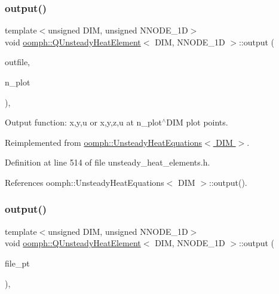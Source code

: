 \subsubsection{\texorpdfstring{output()}{output()}\hspace{0.1cm}{\footnotesize\ttfamily [2/4]}}
{\footnotesize\ttfamily template$<$unsigned D\+IM, unsigned N\+N\+O\+D\+E\+\_\+1D$>$ \\
void \hyperlink{classoomph_1_1QUnsteadyHeatElement}{oomph\+::\+Q\+Unsteady\+Heat\+Element}$<$ D\+IM, N\+N\+O\+D\+E\+\_\+1D $>$\+::output (\begin{DoxyParamCaption}\item[{std\+::ostream \&}]{outfile,  }\item[{const unsigned \&}]{n\+\_\+plot }\end{DoxyParamCaption})\hspace{0.3cm}{\ttfamily [inline]}, {\ttfamily [virtual]}}



Output function\+: x,y,u or x,y,z,u at n\+\_\+plot$^\wedge$\+D\+IM plot points. 



Reimplemented from \hyperlink{classoomph_1_1UnsteadyHeatEquations_a68794ad133c4a06bed09488cc7cd5e94}{oomph\+::\+Unsteady\+Heat\+Equations$<$ D\+I\+M $>$}.



Definition at line 514 of file unsteady\+\_\+heat\+\_\+elements.\+h.



References oomph\+::\+Unsteady\+Heat\+Equations$<$ D\+I\+M $>$\+::output().

\mbox{\label{classoomph_1_1QUnsteadyHeatElement_a8fc87ff8818027bbbb9aa48b4ab5cd91}} 
\subsubsection{\texorpdfstring{output()}{output()}\hspace{0.1cm}{\footnotesize\ttfamily [3/4]}}
{\footnotesize\ttfamily template$<$unsigned D\+IM, unsigned N\+N\+O\+D\+E\+\_\+1D$>$ \\
void \hyperlink{classoomph_1_1QUnsteadyHeatElement}{oomph\+::\+Q\+Unsteady\+Heat\+Element}$<$ D\+IM, N\+N\+O\+D\+E\+\_\+1D $>$\+::output (\begin{DoxyParamCaption}\item[{F\+I\+LE $\ast$}]{file\+\_\+pt }\end{DoxyParamCaption})\hspace{0.3cm}{\ttfamily [inline]}, {\ttfamily [virtual]}}



